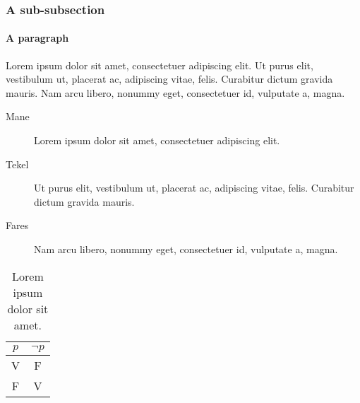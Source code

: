 \subsubsection*{A sub-subsection}
\lipsum[3]

\paragraph{A paragraph} Lorem ipsum dolor sit amet, consectetuer adipiscing elit. Ut purus elit, vestibulum ut, placerat ac, adipiscing vitae, felis. Curabitur dictum gravida mauris. Nam arcu libero, nonummy eget, consectetuer id, vulputate a, magna.

\bigskip

\lipsum[2]

\begin{description}
\item[Mane] Lorem ipsum dolor sit amet, consectetuer adipiscing elit. 
\item[Tekel] Ut purus elit, vestibulum ut, placerat ac, adipiscing vitae, felis. Curabitur dictum gravida mauris.
\item[Fares] Nam arcu libero, nonummy eget, consectetuer 
id, vulputate a, magna.
\end{description}

\begin{table}
\caption[Lorem ipsum dolor.]{Lorem ipsum dolor sit amet.}
\centering
\begin{tabular}{cc}
\toprule
$p$ & $\lnot p$ \\ 
\midrule
V   & F \\ 
F   & V \\
\bottomrule 
\end{tabular}
\end{table}

\lipsum[1]




